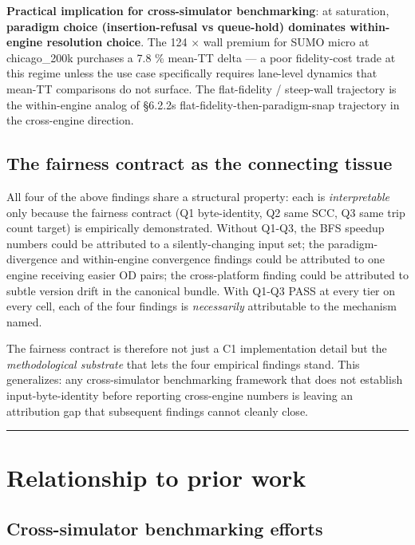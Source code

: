 \textbf{Practical implication for cross-simulator benchmarking}: at
saturation, \textbf{paradigm choice (insertion-refusal vs queue-hold)
dominates within-engine resolution choice}. The 124 × wall premium for
SUMO micro at chicago\_200k purchases a 7.8 \% mean-TT delta --- a poor
fidelity-cost trade at this regime unless the use case specifically
requires lane-level dynamics that mean-TT comparisons do not surface.
The flat-fidelity / steep-wall trajectory is the within-engine analog of
§6.2.2\textquotesingle s flat-fidelity-then-paradigm-snap trajectory in
the cross-engine direction.

\subsection{The fairness contract as the connecting
tissue}\label{625-the-fairness-contract-as-the-connecting-tissue}

All four of the above findings share a structural property: each is
\emph{interpretable} only because the fairness contract (Q1
byte-identity, Q2 same SCC, Q3 same trip count target) is empirically
demonstrated. Without Q1-Q3, the BFS speedup numbers could be attributed
to a silently-changing input set; the paradigm-divergence and
within-engine convergence findings could be attributed to one engine
receiving easier OD pairs; the cross-platform finding could be
attributed to subtle version drift in the canonical bundle. With Q1-Q3
PASS at every tier on every cell, each of the four findings is
\emph{necessarily} attributable to the mechanism named.

The fairness contract is therefore not just a C1 implementation detail
but the \emph{methodological substrate} that lets the four empirical
findings stand. This generalizes: any cross-simulator benchmarking
framework that does not establish input-byte-identity before reporting
cross-engine numbers is leaving an attribution gap that subsequent
findings cannot cleanly close.

\begin{center}\rule{0.5\linewidth}{0.5pt}\end{center}

\section{Relationship to prior
work}\label{63-relationship-to-prior-work}

\subsection{Cross-simulator benchmarking
efforts}\label{631-cross-simulator-benchmarking-efforts}


